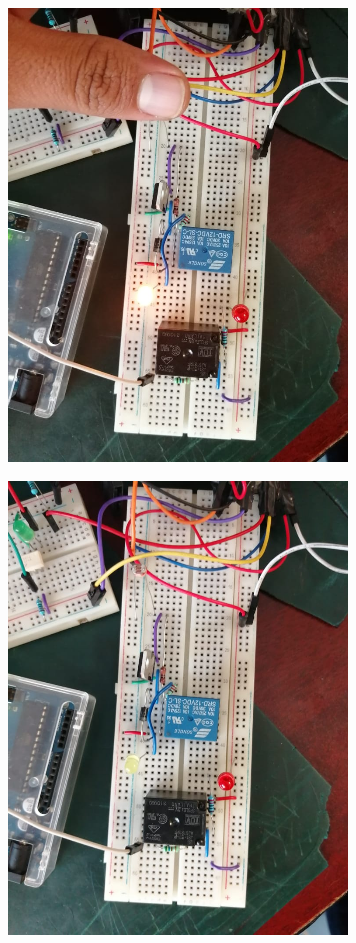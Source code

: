 \documentclass[11pt,a4paper]{article}
\begin{document}
\begin{figure}[hbtp]
\centering
\includegraphics[scale=0.40]{6.png}
\end{figure}


\begin{figure}[hbtp]
\centering
\includegraphics[scale=0.40]{7.png}
\end{figure}
\end{document}

